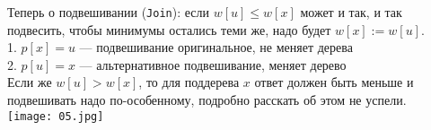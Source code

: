 Теперь о подвешивании (\texttt{Join}): если $w[u] \le w[x]$ может и так, и так подвесить, чтобы минимумы остались теми же, надо будет $w[x] := w[u]$. \\
1. $p[x] = u$ — подвешивание оригинальное, не меняет дерева \\
2. $p[u] = x$ — альтернативное подвешивание, меняет дерево \\

Если же $w[u] > w[x]$, то для поддерева $x$ ответ должен быть меньше и подвешивать надо по-особенному, подробно расскать об этом не успели. \\

\texttt{[image: 05.jpg]}\\


